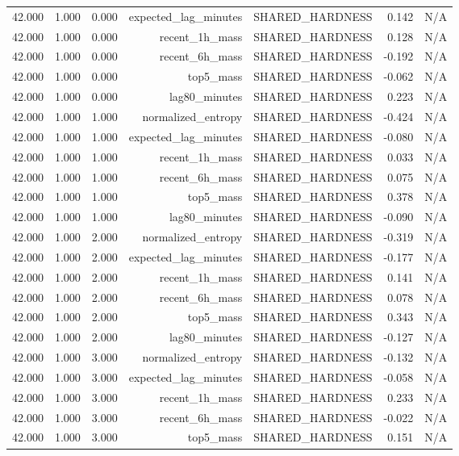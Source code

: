 \begin{table}[h!]
\begin{tabular}{lrrrrrr}
42.000 & 1.000 & 0.000 & expected\_lag\_minutes & SHARED\_HARDNESS & 0.142 & N/A \\
42.000 & 1.000 & 0.000 & recent\_1h\_mass & SHARED\_HARDNESS & 0.128 & N/A \\
42.000 & 1.000 & 0.000 & recent\_6h\_mass & SHARED\_HARDNESS & -0.192 & N/A \\
42.000 & 1.000 & 0.000 & top5\_mass & SHARED\_HARDNESS & -0.062 & N/A \\
42.000 & 1.000 & 0.000 & lag80\_minutes & SHARED\_HARDNESS & 0.223 & N/A \\
42.000 & 1.000 & 1.000 & normalized\_entropy & SHARED\_HARDNESS & -0.424 & N/A \\
42.000 & 1.000 & 1.000 & expected\_lag\_minutes & SHARED\_HARDNESS & -0.080 & N/A \\
42.000 & 1.000 & 1.000 & recent\_1h\_mass & SHARED\_HARDNESS & 0.033 & N/A \\
42.000 & 1.000 & 1.000 & recent\_6h\_mass & SHARED\_HARDNESS & 0.075 & N/A \\
42.000 & 1.000 & 1.000 & top5\_mass & SHARED\_HARDNESS & 0.378 & N/A \\
42.000 & 1.000 & 1.000 & lag80\_minutes & SHARED\_HARDNESS & -0.090 & N/A \\
42.000 & 1.000 & 2.000 & normalized\_entropy & SHARED\_HARDNESS & -0.319 & N/A \\
42.000 & 1.000 & 2.000 & expected\_lag\_minutes & SHARED\_HARDNESS & -0.177 & N/A \\
42.000 & 1.000 & 2.000 & recent\_1h\_mass & SHARED\_HARDNESS & 0.141 & N/A \\
42.000 & 1.000 & 2.000 & recent\_6h\_mass & SHARED\_HARDNESS & 0.078 & N/A \\
42.000 & 1.000 & 2.000 & top5\_mass & SHARED\_HARDNESS & 0.343 & N/A \\
42.000 & 1.000 & 2.000 & lag80\_minutes & SHARED\_HARDNESS & -0.127 & N/A \\
42.000 & 1.000 & 3.000 & normalized\_entropy & SHARED\_HARDNESS & -0.132 & N/A \\
42.000 & 1.000 & 3.000 & expected\_lag\_minutes & SHARED\_HARDNESS & -0.058 & N/A \\
42.000 & 1.000 & 3.000 & recent\_1h\_mass & SHARED\_HARDNESS & 0.233 & N/A \\
42.000 & 1.000 & 3.000 & recent\_6h\_mass & SHARED\_HARDNESS & -0.022 & N/A \\
42.000 & 1.000 & 3.000 & top5\_mass & SHARED\_HARDNESS & 0.151 & N/A \\

\end{tabular}
\end{table}
